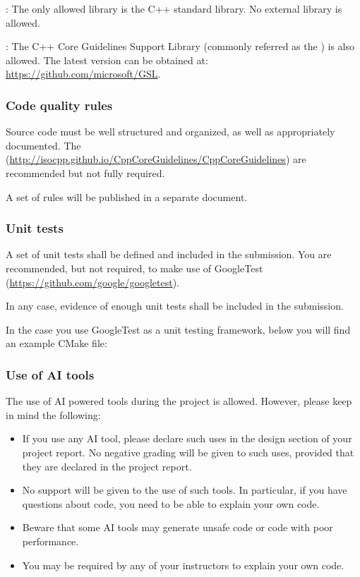 : 
The only allowed library is the C++ standard library.
No external library is allowed.

: The C++ Core Guidelines Support Library (commonly referred as
the ) is also allowed. The latest version can be obtained at:
\url{https://github.com/microsoft/GSL}.

\subsubsection{Code quality rules}

Source code must be well structured and organized, 
as well as appropriately documented.
The 
(\url{http://isocpp.github.io/CppCoreGuidelines/CppCoreGuidelines})
are recommended but not fully required.

A set of rules will be published in a separate document.

\subsubsection{Unit tests}

A set of unit tests shall be defined and included in the submission.
You are recommended, but not required, to make use of GoogleTest
(\url{https://github.com/google/googletest}).

In any case, evidence of enough unit tests shall be included in the
submission.

In the case you use GoogleTest as a unit testing framework, below you will
find an example CMake file:



\subsubsection{Use of AI tools}

The use of AI powered tools during the project is allowed. However, please
keep in mind the following:

\begin{itemize}

\item If you use any AI tool, please declare such uses in the design section
of your project report. No negative grading will be given to such uses, provided
that they are declared in the project report.

\item No support will be given to the use of such tools. In particular, if you
have questions about code, you need to be able to explain your own code.

\item Beware that some AI tools may generate unsafe code or code with poor 
performance.

\item You may be required by any of your instructors to explain your own code.


\end{itemize}

